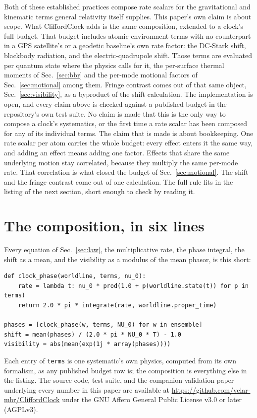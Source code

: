 \documentclass[aps,pra,superscriptaddress,groupedaddress,nofootinbib]{revtex4-2}
\begin{document}
Both of these established practices compose rate scalars for the
gravitational and kinematic terms general relativity itself supplies.
This paper's own claim is about scope. What
CliffordClock adds is the same composition, extended to a clock's
full budget. That budget includes atomic-environment terms with no
counterpart in a GPS satellite's or a geodetic baseline's own rate
factor: the DC-Stark shift, blackbody radiation, and the
electric-quadrupole shift. Those terms are evaluated per quantum state where the
physics calls for it, the per-surface thermal moments of
Sec.~\ref{sec:bbr} and the per-mode motional factors of
Sec.~\ref{sec:motional} among them. Fringe contrast comes out of
that same object, Sec.~\ref{sec:visibility}, as a byproduct of the
shift calculation. The implementation is open, and every
claim above is checked against a published budget in the repository's
own test suite. No claim is made that this is the only way to compose a
clock's systematics, or the first time a rate scalar has been
composed for any of its individual terms. The claim that is made is
about bookkeeping. One rate scalar per atom carries the whole budget:
every effect enters it the same way, and adding an effect means adding
one factor. Effects that share the same underlying motion stay
correlated, because they multiply the same per-mode rate. That
correlation is what closed the budget of Sec.~\ref{sec:motional}. The
shift and the fringe contrast come out of one calculation. The full rule fits in the
listing of the next section, short enough to check by reading it.

\section{The composition, in six lines}
\label{sec:close}

Every equation of Sec.~\ref{sec:law}, the multiplicative rate, the
phase integral, the shift as a mean, and the visibility as a
modulus of the mean phasor, is this short:

\begin{widetext}
\noindent\begin{minipage}{\linewidth}
\footnotesize
\begin{verbatim}
def clock_phase(worldline, terms, nu_0):
    rate = lambda t: nu_0 * prod(1.0 + p(worldline.state(t)) for p in terms)
    return 2.0 * pi * integrate(rate, worldline.proper_time)

phases = [clock_phase(w, terms, NU_0) for w in ensemble]
shift = mean(phases) / (2.0 * pi * NU_0 * T) - 1.0
visibility = abs(mean(exp(1j * array(phases))))
\end{verbatim}
\normalsize
\end{minipage}
\end{widetext}

Each entry of \texttt{terms} is one systematic's own physics, computed
from its own formalism, as any published budget row is; the
composition is everything else in the listing. The source code,
test suite, and the companion validation paper underlying every number
in this paper are available at
\url{https://github.com/velar-mbr/CliffordClock} under the GNU
Affero General Public License v3.0 or later (AGPLv3).


\end{document}
